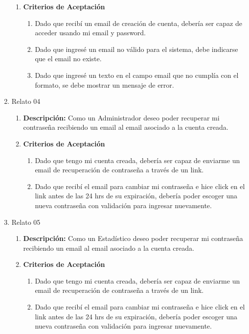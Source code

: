 \begin{enumerate}
\begin{enumerate}
			\item \textbf{Criterios de Aceptación}
				\begin{enumerate}
					\item Dado que recibí un email de creación de cuenta, debería ser capaz de acceder usando mi email y password.
					\item Dado que ingresé un email no válido para el sistema, debe indicarse que el email no existe.
					\item Dado que ingresé un texto en el campo email que no cumplía con el formato, se debe mostrar un mensaje de error.
				\end{enumerate}
		\end{enumerate}
	\item Relato 04
		\begin{enumerate}
			\item \textbf{Descripción:} Como un Administrador deseo poder recuperar mi contraseña recibiendo un email al email asociado a la cuenta creada.
			\item \textbf{Criterios de Aceptación}
				\begin{enumerate}
					\item Dado que tengo mi cuenta creada, debería ser capaz de enviarme un email de recuperación de contraseña a través de un link.
					\item Dado que recibí el email para cambiar mi contraseña e hice click en el link antes de las 24 hrs de su expiración, debería poder escoger una nueva contraseña con validación para ingresar nuevamente.
				\end{enumerate}
		\end{enumerate}
	\item Relato 05
		\begin{enumerate}
			\item \textbf{Descripción:} Como un Estadístico deseo poder recuperar mi contraseña recibiendo un email al email asociado a la cuenta creada.
			\item \textbf{Criterios de Aceptación}
				\begin{enumerate}
					\item Dado que tengo mi cuenta creada, debería ser capaz de enviarme un email de recuperación de contraseña a través de un link.
					\item Dado que recibí el email para cambiar mi contraseña e hice click en el link antes de las 24 hrs de su expiración, debería poder escoger una nueva contraseña con validación para ingresar nuevamente.
				\end{enumerate}

\end{enumerate}
\end{enumerate}
